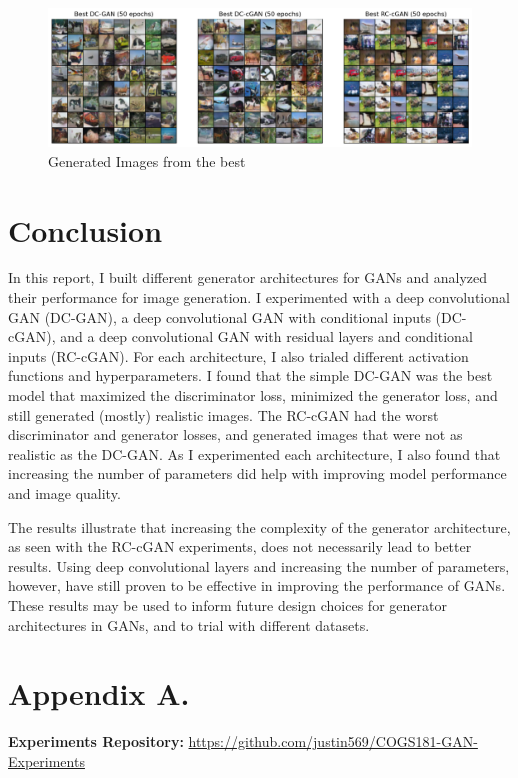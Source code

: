 \documentclass[twoside,11pt]{article}
\begin{document}
\begin{figure}[h!]
  \centering
  \includegraphics[width=18cm]{images/results-outputs-small.png}
  \caption{Generated Images from the best }
  \label{fig:results-outputs}
\end{figure}

\newpage

\section{Conclusion}

In this report, I built different generator architectures for GANs and analyzed their performance for image generation. I experimented with a deep convolutional GAN (DC-GAN), a deep convolutional GAN with conditional inputs (DC-cGAN), and a deep convolutional GAN with residual layers and conditional inputs (RC-cGAN). For each architecture, I also trialed different activation functions and hyperparameters. I found that the simple DC-GAN was the best model that maximized the discriminator loss, minimized the generator loss, and still generated (mostly) realistic images. The RC-cGAN had the worst discriminator and generator losses, and generated images that were not as realistic as the DC-GAN. As I experimented each architecture, I also found that increasing the number of parameters did help with improving model performance and image quality.

The results illustrate that increasing the complexity of the generator architecture, as seen with the RC-cGAN experiments, does not necessarily lead to better results. Using deep convolutional layers and increasing the number of parameters, however, have still proven to be effective in improving the performance of GANs. These results may be used to inform future design choices for generator architectures in GANs, and to trial with different datasets.




\appendix
\section*{Appendix A.}

\textbf{Experiments Repository:} \url{https://github.com/justin569/COGS181-GAN-Experiments}

\vskip 0.2in

\end{document}
